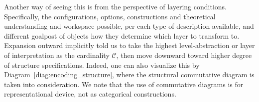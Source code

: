 Another way of seeing this is from the perspective of layering conditions. Specifically, the configurations, options, constructions and theoretical understanding and workspace possible, per each type of description available, and different goalpost of objects how they determine which layer to transform to. Expansion outward implicitly told us to take the highest level-abstraction or layer of interpretation as the cardinality $\mathcal{C}$, then move downward toward higher degree of structure specifications. Indeed, one can also visualize this by Diagram~\ref{diag:encoding_structure}, where the structural commutative diagram is taken into consideration. We note that the use of commutative diagrams is for representational device, not as categorical constructions. 

\begin{figure}[htb]
  \centering
\end{figure}
